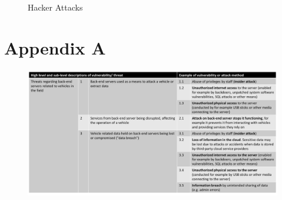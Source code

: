 \begin{figure}[H]
\begin{center}
    \end{center}
    \caption{Hacker Attacks}
    \label{fig:Hacker_Attacks}
    \vspace*{-0.4cm}
\end{figure}


\chapter*{Appendix A}
\begin{figure}[htpb]
	\centering
	\includegraphics[scale=0.4]{img/table.png}
\end{figure}
